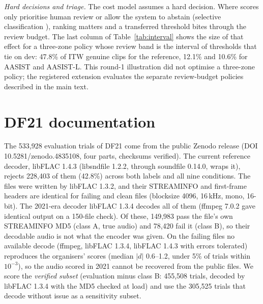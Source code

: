 \documentclass[10pt]{article}
\newcommand{\tauE}{\tau^{*}_{\mathrm{EER}}}
\begin{document}
\begin{table}[!ht]
\caption{The registered cost check at \(\tauE\): normalised cost at the transferred threshold, the cost of the target-oracle threshold (discrimination) and the remainder (transfer).}
\label{tab:costsplit}
\centering
\footnotesize

\end{table}

\begin{table}[!ht]
\caption{Stability of the model with the largest gap, over 1,000 paired speaker-bootstrap replicates.}
\label{tab:stab}
\centering
\footnotesize

\end{table}

\emph{Hard decisions and triage.} The cost model assumes a hard decision. Where scores only prioritise human review or allow the system to abstain
(selective classification \citep{geifman17_selective}), ranking matters and a transferred threshold bites through the review budget. The last
column of Table~\ref{tab:interval} shows the size of that effect for a three-zone policy whose review band is the interval of thresholds that
tie on dev: 47.8\% of ITW genuine clips for the reference, 12.1\% and 10.6\% for AASIST and AASIST-L. This round-1 illustration did not optimise a three-zone policy; the registered extension evaluates the separate review-budget policies described in the main text.

\section{DF21 documentation}
The 533,928 evaluation trials of DF21 come from the public Zenodo release (DOI 10.5281/zenodo.4835108, four parts, checksums verified). The
current reference decoder, libFLAC 1.4.3 (libsndfile 1.2.2, through soundfile 0.14.0, wraps it), rejects 228,403 of them (42.8\%) across both
labels and all nine conditions. The files were written by libFLAC 1.3.2, and their STREAMINFO and first-frame headers are identical for failing
and clean files (blocksize 4096, 16\,kHz, mono, 16-bit). The 2021-era decoder libFLAC 1.3.4 decodes all of them (ffmpeg 7.0.2 gave identical
output on a 150-file check). Of these, 149,983 pass the file's own STREAMINFO MD5 (class A, true audio) and 78,420 fail it (class B), so their
decodable audio is not what the encoder was given. On the failing files no available decode (ffmpeg, libFLAC 1.3.4, libFLAC 1.4.3 with errors tolerated) reproduces the
organisers' scores (median \(|d|\) 0.6--1.2, under 5\% of trials within \(10^{-3}\)), so the audio scored in 2021 cannot be recovered from the
public files. We score the \emph{verified subset} (evaluation minus class B: 455,508 trials, decoded by libFLAC 1.3.4 with the MD5 checked at
load) and use the 305,525 trials that decode without issue as a sensitivity subset.
\end{document}
